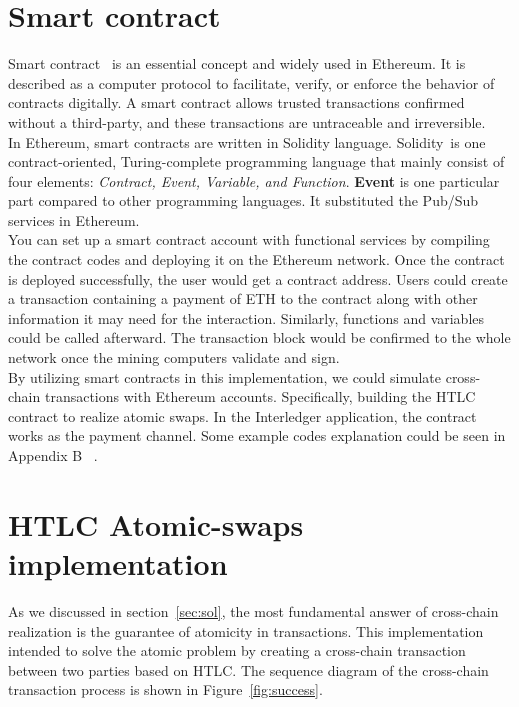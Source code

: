 
\section{Smart contract}
\noindent Smart contract~\cite{governatori2018legal} is an essential concept and widely used in Ethereum. It is described as a computer protocol to facilitate, verify, or enforce the behavior of contracts digitally. A smart contract allows trusted transactions confirmed without a third-party, and these transactions are untraceable and irreversible. \\

\noindent In Ethereum, smart contracts are written in Solidity language. Solidity~\cite{dannen2017introducing}is one contract-oriented, Turing-complete programming language that mainly consist of four elements: \textit{Contract, Event, Variable, and Function}. \textbf{Event} is one particular part compared to other programming languages. It substituted the Pub/Sub services in Ethereum.\\

\noindent You can set up a smart contract account with functional services by compiling the contract codes and deploying it on the Ethereum network. Once the contract is deployed successfully, the user would get a contract address.  Users could create a transaction containing a payment of ETH to the contract along with other information it may need for the interaction. Similarly, functions and variables could be called afterward. The transaction block would be confirmed to the whole network once the mining computers validate and sign.\\

\noindent By utilizing smart contracts in this implementation, we could simulate cross-chain transactions with Ethereum accounts. Specifically, building the HTLC contract to realize atomic swaps. In the Interledger application, the contract works as the payment channel. Some example codes explanation could be seen in Appendix B ~.

\section{HTLC Atomic-swaps implementation}
\label{sec:imp}
\noindent As we discussed in section~\ref{sec:sol}, the most fundamental answer of cross-chain realization is the guarantee of atomicity in transactions. This implementation intended to solve the atomic problem by creating a cross-chain transaction between two parties based on HTLC. The sequence diagram of the cross-chain transaction process is shown in Figure~\ref{fig:success}.\\

